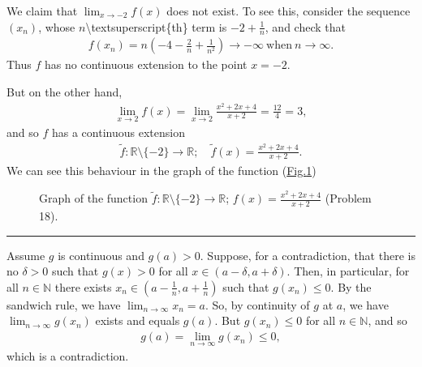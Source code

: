 \documentclass[letterpaper,10pt,english]{jupyterBook}
\let\sphinxpxdimen\pdfpxdimen\else\newdimen\sphinxpxdimen
\begin{document}
We claim that \(\lim_{x \rightarrow -2}f(x)\) does not exist. To see this, consider the sequence \((x_{n})\), whose \(n\)\textbackslash{}textsuperscript\{th\} term is \(-2 + \frac{1}{n}\), and check that
\begin{equation*}
\begin{split}
f(x_{n}) = n\left(-4 -\frac{2}{n} + \frac{1}{n^2}\right) \rightarrow -\infty~\mbox{when}~n \rightarrow \infty.
\end{split}
\end{equation*}
\sphinxAtStartPar
Thus \(f\) has no continuous extension to the point \(x =-2\).

But on the other hand,
\begin{equation*}
\begin{split}
\lim_{x \rightarrow 2}f(x) = \lim_{x\rightarrow 2}  \frac{x^{2} + 2x + 4}{x + 2} = \frac{12}{4} = 3,
\end{split}
\end{equation*}
\sphinxAtStartPar
and so \(f\) has a continuous extension
\begin{equation*}
\begin{split}
\tilde{f}:\mathbb{R} \setminus \{-2\}\to\mathbb{R}; \hspace{1em} \tilde{f}(x) = \frac{x^2+2x+4}{x+2}.
\end{split}
\end{equation*}
\sphinxAtStartPar
We can see this behaviour in the graph of the function (\hyperref[\detokenize{Solutions-full:q18}]{Fig.\@ \ref{\detokenize{Solutions-full:q18}}})

\begin{figure}[htbp]
\centering
\capstart

\noindent\sphinxincludegraphics[width=500\sphinxpxdimen]{{(x2+2x+4),(x+2)}.png}
\caption{Graph of the function \(\tilde{f}:\mathbb{R}\setminus\{-2\}\to\mathbb{R}\); \(f(x)=\frac{x^2+2x+4}{x+2}\) (Problem 18).}\label{\detokenize{Solutions-full:q18}}\end{figure}


\bigskip\hrule\bigskip


\sphinxAtStartPar
{\hyperref[\detokenize{Problems:id19}]{}}  Assume \(g\) is continuous and \(g(a) > 0\). Suppose, for a contradiction, that  there is no  \(\delta > 0\) such that \(g(x) > 0\)  for all \( x \in (a - \delta, a + \delta)\). Then, in particular, for all \(n\in\mathbb{N}\) there exists \(x_{n} \in \left(a - \frac{1}{n}, a + \frac{1}{n}\right)\) such that \(g(x_{n}) \leq 0\). By the sandwich rule, we have \(\lim_{n\rightarrow\infty} x_{n} = a\). So, by continuity of \(g\) at \(a\), we have \(\lim_{n\rightarrow\infty} g(x_{n})\) exists and equals \(g(a)\). But \(g(x_n)\leq 0\) for all \(n\in\mathbb{N}\), and so
\begin{equation*}
\begin{split}
g(a)=\lim_{n\rightarrow\infty} g(x_{n}) \leq 0,
\end{split}
\end{equation*}
\sphinxAtStartPar
which is a contradiction.
\end{document}

